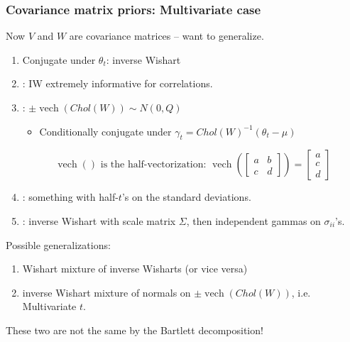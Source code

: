 \documentclass[xcolor=dvipsnames]{beamer}
\DeclareMathOperator{\vech}{vech}
\begin{document}
\begin{frame}
\frametitle{Covariance matrix priors: Multivariate case}
Now $V$ and $W$ are covariance matrices -- want to generalize.
\pause \begin{enumerate}
\item Conjugate under $\theta_t$: inverse Wishart
\item \citet{alvarez2014cov}: IW extremely informative for correlations.
\item \citet{fruhwirth2008bayesian}: $\pm\vech(Chol(W))\sim N(0,Q)$\\
\begin{itemize}
\item[] Conditionally conjugate under $\gamma_t= Chol(W)^{-1}(\theta_t - \mu)$
\end{itemize}
\[
\mbox{$\vech()$ is the half-vectorization:  }\vech\left(\begin{bmatrix} a & b \\ c & d \end{bmatrix}\right) = \begin{bmatrix}a\\c\\d\end{bmatrix}
\]

\item \citet{gelman2006prior}: something with half-$t$'s on the standard deviations.
\item \citet{huang2013simple}: inverse Wishart with scale matrix $\Sigma$, then independent gammas on $\sigma_{ii}$'s.
\end{enumerate}
\pause Possible generalizations:\\
\begin{enumerate}
\item Wishart mixture of inverse Wisharts (or vice versa)
\item inverse Wishart mixture of normals on $\pm\vech(Chol(W))$, i.e. Multivariate $t$.
\end{enumerate}
\pause These two are not the same by the Bartlett decomposition! 
\end{frame}


\end{document}
